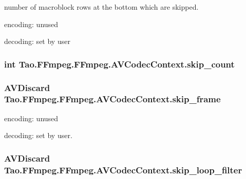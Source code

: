 \label{struct_tao_1_1_f_fmpeg_1_1_f_fmpeg_1_1_a_v_codec_context_ac58332fd0b490e059d21d2fada767f25}
number of macroblock rows at the bottom which are skipped.
\begin{DoxyItemize}
\item encoding: unused
\item decoding: set by user 
\end{DoxyItemize}\hypertarget{struct_tao_1_1_f_fmpeg_1_1_f_fmpeg_1_1_a_v_codec_context_a8881d2ade84ce86f9b519b2e60aaed3f}{
\subsubsection[{skip\_\-count}]{\setlength{\rightskip}{0pt plus 5cm}int {\bf Tao.FFmpeg.FFmpeg.AVCodecContext.skip\_\-count}}}
\label{struct_tao_1_1_f_fmpeg_1_1_f_fmpeg_1_1_a_v_codec_context_a8881d2ade84ce86f9b519b2e60aaed3f}
\hypertarget{struct_tao_1_1_f_fmpeg_1_1_f_fmpeg_1_1_a_v_codec_context_a790b9eb336d9d8983b8b5246bf596136}{
\subsubsection[{skip\_\-frame}]{\setlength{\rightskip}{0pt plus 5cm}AVDiscard {\bf Tao.FFmpeg.FFmpeg.AVCodecContext.skip\_\-frame}}}
\label{struct_tao_1_1_f_fmpeg_1_1_f_fmpeg_1_1_a_v_codec_context_a790b9eb336d9d8983b8b5246bf596136}

\begin{DoxyItemize}
\item encoding: unused
\item decoding: set by user. 
\end{DoxyItemize}\hypertarget{struct_tao_1_1_f_fmpeg_1_1_f_fmpeg_1_1_a_v_codec_context_acc2c5f476a89696bb8b61b052860c8a4}{
\subsubsection[{skip\_\-loop\_\-filter}]{\setlength{\rightskip}{0pt plus 5cm}AVDiscard {\bf Tao.FFmpeg.FFmpeg.AVCodecContext.skip\_\-loop\_\-filter}}}
\label{struct_tao_1_1_f_fmpeg_1_1_f_fmpeg_1_1_a_v_codec_context_acc2c5f476a89696bb8b61b052860c8a4}

